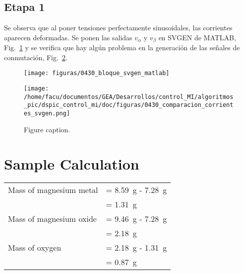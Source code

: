 \documentclass{article}
\begin{document}
	
	
	\subsection{Etapa 1}
	
		Se observa que al poner tensiones perfectamente sinusoidales, las corrientes aparecen deformadas. Se ponen las salidas $v_\alpha$ y $v_\beta$ en SVGEN de MATLAB, Fig.~\ref{fig:bloque_svgen_matlab} \textsc{}y se verifica que hay algún problema en la generación de las señales de conmutación, Fig.~\ref{fig:comparacion_corrientes}.
	
	\begin{figure}
		\centering
		\texttt{[image: figuras/0430\_bloque\_svgen\_matlab]}
		\caption[Ejemplo de bloque SVGEN de MATLAB.]{}
		\label{fig:bloque_svgen_matlab}
	\end{figure}
	
	
	
	\begin{figure}[h]
	\begin{center}
		\texttt{[image: /home/facu/documentos/GEA/Desarrollos/control\_MI/algoritmos\_pic/dspic\_control\_mi/doc/figuras/0430\_comparacion\_corrientes\_svgen.png]} %
		\caption{Figure caption.}
		\label{fig:comparacion_corrientes}
	\end{center}
	\end{figure}
	
	
	\section{Sample Calculation}
	
	\begin{tabular}{ll}
		Mass of magnesium metal & = \SI{8.59}{\gram} - \SI{7.28}{\gram}\\
		& = \SI{1.31}{\gram}\\
		Mass of magnesium oxide & = \SI{9.46}{\gram} - \SI{7.28}{\gram}\\
		& = \SI{2.18}{\gram}\\
		Mass of oxygen & = \SI{2.18}{\gram} - \SI{1.31}{\gram}\\
		& = \SI{0.87}{\gram}
	\end{tabular}
	
\end{document}
